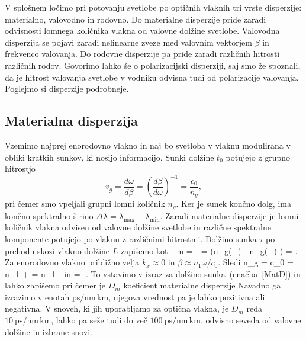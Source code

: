 V splošnem ločimo pri potovanju svetlobe po optičnih vlaknih tri 
vrste disperzije: materialno, valovodno in rodovno. 
Do materialne disperzije pride zaradi odvisnosti lomnega količnika vlakna od 
valovne dolžine svetlobe. Valovodna disperzija se pojavi zaradi nelinearne zveze 
med valovnim vektorjem $\beta$ in frekvenco valovanja. Do rodovne
disperzije pa pride zaradi različnih hitrosti različnih rodov. Govorimo lahko še o 
polarizacijski disperziji, saj smo že spoznali, da je hitrost valovanja svetlobe 
v vodniku odvisna tudi od polarizacije valovanja. Poglejmo si disperzije podrobneje. 

\subsection*{Materialna disperzija}
Vzemimo najprej enorodovno vlakno in naj bo svetloba v vlaknu modulirana
v obliki kratkih sunkov, ki nosijo informacijo. Sunki dolžine $t_0$ 
potujejo z grupno hitrostjo 
\begin{equation}
v_{g}=\frac{d\omega}{d\beta}=\left(\frac{d\beta}{d\omega}\right)^{-1} = \frac{c_0}{n_g},
\label{9.51}
\end{equation}
pri čemer smo vpeljali grupni lomni količnik $n_g$. Ker je sunek končno dolg, 
ima končno spektralno širino $\Delta \lambda=\lambda_{\mathrm{max}}-\lambda_{\mathrm{min}}
$. Zaradi materialne disperzije je lomni količnik vlakna odvisen od
valovne dolžine svetlobe in različne spektralne komponente potujejo po vlaknu z različnimi
hitrostmi. Dolžino sunka $\tau$ po prehodu skozi vlakno dolžine $L$ zapišemo kot
\beq
\tau_m =  -  = 
\left(n_g(\lambda_{}) - n_g(\lambda_{}) \right) 
= \Delta \lambda.
\label{MatD}
\eeq
Za enorodovno vlakno približno velja $k_x \approx 0$ in $\beta \approx n_1 \omega/c_0$. 
Sledi
\beq
n_g = c_0  = n_1 + \omega {} = n_1 - \lambda 
{}
\eeq
in
\beq
{} = -\lambda{}.
\eeq
To vstavimo v izraz za dolžino sunka~(enačba~\ref{MatD}) in lahko zapišemo
pri čemer je $D_m$ koeficient materialne disperzije
Navadno ga izrazimo v enotah $\si{\pico\second/\nano\meter\, \kilo\meter}$, 
njegova vrednost pa je lahko pozitivna ali negativna. 
V snoveh, ki jih uporabljamo za optična vlakna, je $D_m$ reda 
$10~\si{\pico\second/\nano\meter\, \kilo\meter}$, lahko pa seže
tudi do več $100~\si{\pico\second/\nano\meter\, \kilo\meter}$, odvisno seveda od valovne dolžine
in izbrane snovi. 

